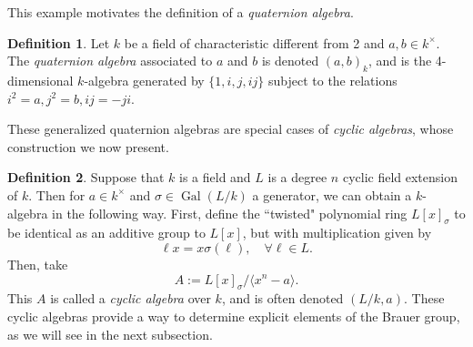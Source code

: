 \documentclass[12pt,twoside]{reedthesis}
\theoremstyle{plain}
\theoremstyle{definition}
\newtheorem{definition}{Definition}[section]
\theoremstyle{remark}
\newcommand{\Gal}{\operatorname{Gal}}
\begin{document}
\noindent This example motivates the definition of a \emph{quaternion algebra}.
\begin{definition}
Let $k$ be a field of characteristic different from 2 and $a,b\in k^\times$. The \emph{quaternion algebra} associated to $a$ and $b$ is denoted $(a,b)_k$, and is the 4-dimensional $k$-algebra generated by $\{1,i,j,ij\}$ subject to the relations $i^2=a, j^2=b, ij=-ji$.
\end{definition}
\noindent These generalized quaternion algebras are special cases of \emph{cyclic algebras}, whose construction we now present.
\begin{definition}
Suppose that $k$ is a field and $L$ is a degree $n$ cyclic field extension of $k$. Then for $a\in k^\times$ and $\sigma\in\Gal(L/k)$ a generator, we can obtain a $k$-algebra in the following way. First, define the ``twisted" polynomial ring $L[x]_\sigma$ to be identical as an additive group to $L[x]$, but with multiplication given by
\[
\ell x=x\sigma(\ell),\quad\forall\ell\in L.
\]
Then, take 
\[
A:=L[x]_\sigma/\langle x^n-a\rangle.
\]
This $A$ is called a \emph{cyclic algebra} over $k$, and is often denoted $(L/k,a)$. These cyclic algebras provide a way to determine explicit elements of the Brauer group, as we will see in the next subsection.
\end{definition}
\end{document}
